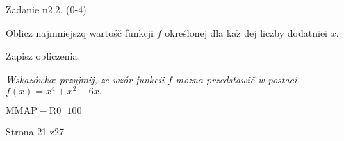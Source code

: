 \documentclass[a4paper,12pt]{article}
\begin{document}
Zadanie n2.2. (0-4)

Oblicz najmniejszq wartośč funkcji $f$ określonej dla $\mathrm{k}\mathrm{a}\dot{\mathrm{z}}$ dej liczby dodatniei $x.$

Zapisz obliczenia.

{\it Wskazówka}: {\it przyjmij, ze wzór funkcii} $f$ {\it mozna przedstawič w postaci} $f(x)=x^{4}+x^{2}-6x.$

$\mathrm{M}\mathrm{M}\mathrm{A}\mathrm{P}-\mathrm{R}0_{-}100$

Strona 21 z27
\end{document}
